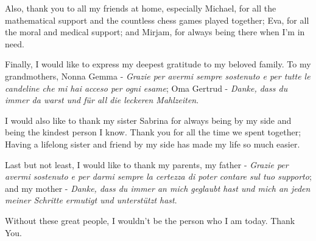 \documentclass[twoside,openright]{scrreprt}
\begin{document}
Also, thank you to all my friends at home, especially Michael, for all the mathematical support and the countless chess games played together; Eva, for all the moral and medical support; and Mirjam, for always being there when I'm in need.

Finally, I would like to express my deepest gratitude to my beloved family. To my grandmothers, Nonna Gemma - \emph{Grazie per avermi sempre sostenuto e per tutte le candeline che mi hai acceso per ogni esame}; Oma Gertrud - \emph{Danke, dass du immer da warst und für all die leckeren Mahlzeiten}.

I would also like to thank my sister Sabrina for always being by my side and being the kindest person I know. Thank you for all the time we spent together; Having a lifelong sister and friend by my side has made my life so much easier.

Last but not least, I would like to thank my parents, my father - \emph{Grazie per avermi sostenuto e per darmi sempre la certezza di poter contare sul tuo supporto}; and my mother - \emph{Danke, dass du immer an mich geglaubt hast und mich an jeden meiner Schritte ermutigt und unterstützt hast}.

Without these great people, I wouldn't be the person who I am today. Thank You.

  



\cleardoublepage

\tableofcontents
{}

\listoffigures

\listoftables























\printbibliography
%
\end{document}
